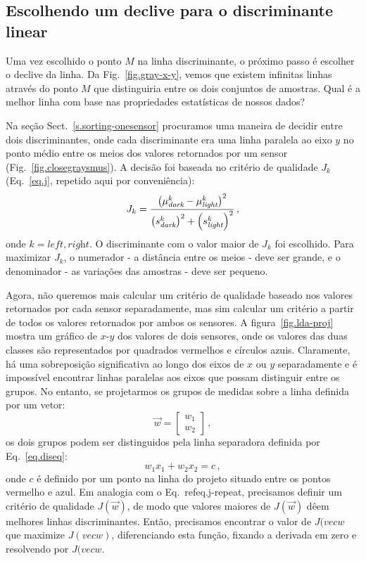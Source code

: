 \subsection{Escolhendo um declive para o discriminante linear}

Uma vez escolhido o ponto $M$ na linha discriminante, o próximo passo é escolher o declive da linha. Da Fig.~\ref{fig.gray-x-y}, vemos que existem infinitas linhas através do ponto $M$ que distinguiria entre os dois conjuntos de amostras. Qual é a melhor linha com base nas propriedades estatísticas de nossos dados?

Na seção Sect.~\ref{s.sorting-onesensor} procuramos uma maneira de decidir entre dois discriminantes, onde cada discriminante era uma linha paralela ao eixo $y$ no ponto médio entre os meios dos valores retornados por um sensor (Fig.~\ref{fig.closegraysmus}). A decisão foi baseada no critério de qualidade $J_k$ (Eq.~\ref{eq.j}, repetido aqui por conveniência):
\begin{equation}
J_k = \frac{\left(\mu_{\textit{\scriptsize dark}}^k - \mu_{\textit{\scriptsize light}}^k\right)^2}{\left(s_{\textit{\scriptsize dark}}^k\right)^2 + \left(s_{\textit{\scriptsize light}}^k\right)^2}\,,\label{eq.j-repeat}
\end{equation}
onde $k=\textit{left},\textit{right}$. O discriminante com o valor maior de $J_k$ foi escolhido. Para maximizar $J_k$, o numerador - a distância entre os meios - deve ser grande, e o denominador - as variações das amostras - deve ser pequeno.

Agora, não queremos mais calcular um critério de qualidade baseado nos valores retornados por cada sensor separadamente, mas sim calcular um critério a partir de todos os valores retornados por ambos os sensores. A figura~\ref{fig.lda-proj} mostra um gráfico de $x$-$y$ dos valores de dois sensores, onde os valores das duas classes são representados por quadrados vermelhos e círculos azuis. Claramente, há uma sobreposição significativa ao longo dos eixos de $x$ ou $y$ separadamente e é impossível encontrar linhas paralelas aos eixos que possam distinguir entre os grupos. No entanto, se projetarmos os grupos de medidas sobre a linha definida por um vetor:
\[
\vec{w} = \left[\begin{array}{c}w_1\\w_2\end{array}\right]\,,
\]
os dois grupos podem ser distinguidos pela linha separadora definida por Eq.~\ref{eq.diseq}:
\[
w_1x_1 + w_2x_2 = c\,,
\]
onde $c$ é definido por um ponto na linha do projeto situado entre os pontos vermelho e azul. Em analogia com o Eq.~ref{eq.j-repeat}, precisamos definir um critério de qualidade $J(\vec{w})$, de modo que valores maiores de $J(\vec{w})$ dêem melhores linhas discriminantes. Então, precisamos encontrar o valor de $J(vec{w}$ que maximize $J(vec{w})$, diferenciando esta função, fixando a derivada em zero e resolvendo por $J(vec{w}$.

